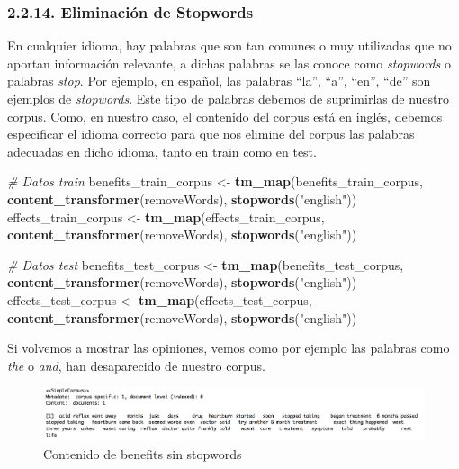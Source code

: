 \documentclass[spanish,]{article}
\newenvironment{Shaded}{\begin{snugshade}}{\end{snugshade}}
\newcommand{\KeywordTok}[1]{\textcolor[rgb]{0.13,0.29,0.53}{\textbf{#1}}}
\newcommand{\StringTok}[1]{\textcolor[rgb]{0.31,0.60,0.02}{#1}}
\newcommand{\CommentTok}[1]{\textcolor[rgb]{0.56,0.35,0.01}{\textit{#1}}}
\newcommand{\NormalTok}[1]{#1}
\begin{document}
\subsubsection{2.2.14. Eliminación de
Stopwords}\label{eliminacion-de-stopwords}

En cualquier idioma, hay palabras que son tan comunes o muy utilizadas
que no aportan información relevante, a dichas palabras se las conoce
como \emph{stopwords} o palabras \emph{stop}. Por ejemplo, en español,
las palabras ``la'', ``a'', ``en'', ``de'' son ejemplos de
\emph{stopwords}. Este tipo de palabras debemos de suprimirlas de
nuestro corpus. Como, en nuestro caso, el contenido del corpus está en
inglés, debemos especificar el idioma correcto para que nos elimine del
corpus las palabras adecuadas en dicho idioma, tanto en train como en
test.

\begin{Shaded}
\begin{Highlighting}[]
\CommentTok{# Datos train}
\NormalTok{benefits_train_corpus <-}\StringTok{ }\KeywordTok{tm_map}\NormalTok{(benefits_train_corpus, }\KeywordTok{content_transformer}\NormalTok{(removeWords), }
                                \KeywordTok{stopwords}\NormalTok{(}\StringTok{"english"}\NormalTok{))}
\NormalTok{effects_train_corpus <-}\StringTok{ }\KeywordTok{tm_map}\NormalTok{(effects_train_corpus, }\KeywordTok{content_transformer}\NormalTok{(removeWords), }
                               \KeywordTok{stopwords}\NormalTok{(}\StringTok{"english"}\NormalTok{))}

\CommentTok{# Datos test}
\NormalTok{benefits_test_corpus <-}\StringTok{ }\KeywordTok{tm_map}\NormalTok{(benefits_test_corpus, }\KeywordTok{content_transformer}\NormalTok{(removeWords), }
                               \KeywordTok{stopwords}\NormalTok{(}\StringTok{"english"}\NormalTok{))}
\NormalTok{effects_test_corpus <-}\StringTok{ }\KeywordTok{tm_map}\NormalTok{(effects_test_corpus, }\KeywordTok{content_transformer}\NormalTok{(removeWords), }
                              \KeywordTok{stopwords}\NormalTok{(}\StringTok{"english"}\NormalTok{))}
\end{Highlighting}
\end{Shaded}

Si volvemos a mostrar las opiniones, vemos como por ejemplo las palabras
como \emph{the} o \emph{and}, han desaparecido de nuestro corpus.

\begin{figure}[h]
    \centering
    \includegraphics[width=1\textwidth]{imagenes/benefits_stopwords.png}
    \caption{Contenido de benefits sin stopwords}
    \label{benefits2}
\end{figure}
\end{document}
